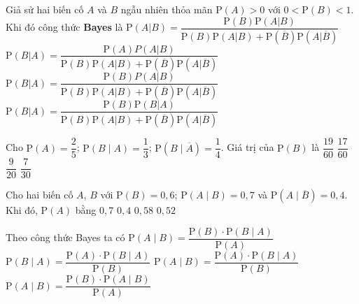 \begin{ex}%
Giả sử hai biến cố $A$ và $B$ ngẫu nhiên thỏa mãn $\mathrm{P}(A)>0$ với $0<\mathrm{P}(B)<1$. Khi đó công thức {\bf Bayes} là
	\choice
	{$\mathrm{P}(A|B)=\dfrac{\mathrm{P}(B)\mathrm{P}(A|B)}{\mathrm{P}(B)\mathrm{P}(A|B)+\mathrm{P}(\overline{B})\mathrm{P}(A|\overline{B})}$}
	{$\mathrm{P}(B|A)=\dfrac{\mathrm{P}(A)P(A|B)}{\mathrm{P}(B)\mathrm{P}(A|B)+\mathrm{P}(\overline{B})\mathrm{P}(A|\overline{B})}$}
	{\True $\mathrm{P}(B|A)=\dfrac{\mathrm{P}(B)P(A|B)}{\mathrm{P}(B)\mathrm{P}(A|B)+\mathrm{P}(\overline{B})\mathrm{P}(A|\overline{B})}$}
	{$\mathrm{P}(B|A)=\dfrac{\mathrm{P}(B)\mathrm{P}(B|A)}{\mathrm{P}(B)\mathrm{P}(A|B)+\mathrm{P}(\overline{B})\mathrm{P}(A|\overline{B})}$}
\end{ex}

\begin{ex}%
	Cho $\mathrm{P}(A)=\dfrac{2}{5}$; $\mathrm{P}(B \mid A)=\dfrac{1}{3}$; $\mathrm{P}(B \mid \overline{A})=\dfrac{1}{4}$. Giá trị của $\mathrm{P}(B)$ là 
	\choice
	{$\dfrac{19}{60}$}
	{\True $\dfrac{17}{60}$}
	{$\dfrac{9}{20}$}
	{$\dfrac{7}{30}$}
\end{ex}

\begin{ex}%
	Cho hai biến cố $A$, $B$ với $\mathrm{P}(B)=0{,}6$; $\mathrm{P}(A \mid B)=0{,}7$ và $\mathrm{P}(A \mid \overline{B})=0{,}4$. Khi đó, $\mathrm{P}(A)$ bằng 
	\choice
	{$0{,}7$}
	{$0{,}4$}
	{\True $0{,}58$}
	{$0{,}52$}
\end{ex}

\begin{ex}%
	Theo công thức Bayes ta có 
	\choice
	{$\mathrm{P}(A \mid B)=\dfrac{\mathrm{P}(B)\cdot \mathrm{P}(B \mid A)}{\mathrm{P}(A)}$}
	{$\mathrm{P}(B \mid A)=\dfrac{\mathrm{P}(A)\cdot \mathrm{P}(B \mid A)}{\mathrm{P}(B)}$}
	{\True $\mathrm{P}(A \mid B)=\dfrac{\mathrm{P}(A)\cdot \mathrm{P}(B \mid A)}{\mathrm{P}(B)}$}
	{$\mathrm{P}(A \mid B)=\dfrac{\mathrm{P}(B)\cdot \mathrm{P}(A \mid B)}{\mathrm{P}(A)}$}
\end{ex}

